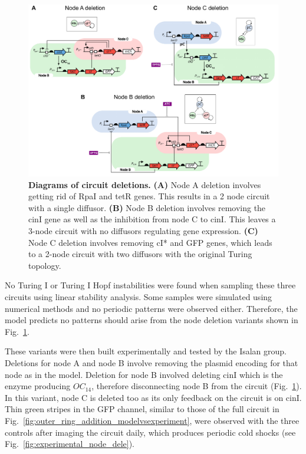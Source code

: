 \begin{figure}[H] %
    \centering
    \begin{adjustbox}{center}
        \includegraphics[width=1.1\textwidth]{chapters/Chapter 3/deletion_circuits} %
    \end{adjustbox}
    \caption{\textbf{Diagrams of circuit deletions.} \textbf{(A)} Node A deletion involves getting rid of RpaI and tetR genes. This results in a 2 node circuit with a single diffusor. \textbf{(B)} Node B deletion involves removing the cinI gene as well as the inhibition from node C to cinI. This leaves a 3-node circuit with no diffusors regulating gene expression. \textbf{(C)} Node C deletion involves removing cI* and GFP genes, which leads to a 2-node circuit with two diffusors with the original Turing topology.}
    \label{fig:deletion_circuits}
\end{figure}

No Turing I or Turing I Hopf instabilities were found when sampling these three circuits using linear stability analysis.
Some samples were simulated using numerical methods and no periodic patterns were observed either.
Therefore, the model predicts no patterns should arise from the node deletion variants shown in Fig.~\ref{fig:deletion_circuits}.

These variants were then built experimentally and tested by the
Isalan group.
Deletions for node A and node B involve removing the plasmid encoding for that node as in the model.
Deletion for node B involved deleting cinI which is the enzyme producing $OC_{14}$, therefore disconnecting node B from the circuit (Fig.~\ref{fig:deletion_circuits}).
In this variant, node C is deleted too as its only feedback on the circuit is on cinI.
Thin green stripes in the GFP channel, similar to those of the full circuit in Fig.~\ref{fig:outer_ring_addition_modelvsexperiment}, were observed with the three controls after imaging the circuit daily, which produces periodic cold shocks (see Fig.~\ref{fig:experimental_node_dele}).



